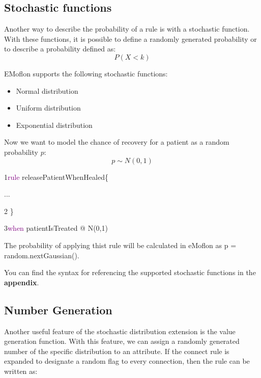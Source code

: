 \subsection{Stochastic functions}

Another way to describe the probability of a rule is with a stochastic function. With these functions, it is possible to define a randomly generated probability or to describe a probability defined as: $$P(X < k) $$

EMoflon supports the following stochastic functions: 

\begin{itemize}
    \item Normal distribution
    \item Uniform distribution
    \item Exponential distribution
\end{itemize}

Now we want to model the chance of recovery for a patient as a random probability $p$:
$$p \sim N(0,1)$$

{

1\hspace{0.5cm}\textcolor{Purple}{rule} releasePatientWhenHealed\{

\hspace{0.75cm}...

2\hspace{0.5cm} \}

3\hspace{0.5cm}\textcolor{Purple}{when} patientIsTreated @ N(0,1)\newline

}

The probability of applying thist rule will be calculated in eMoflon as p = \textsf{random.nextGaussian()}.

You can find the syntax for referencing the supported stochastic functions in the \textbf{appendix}.

\subsection{Number Generation}

Another useful feature of the stochastic distribution extension is the value generation function. With this feature, we can assign a randomly generated number of the specific distribution to an attribute. If the connect rule is expanded to designate a random flag to every connection, then the rule can be written as:\newline

